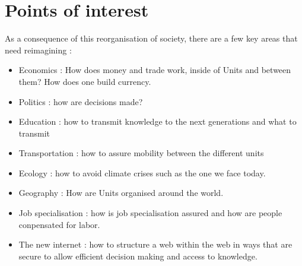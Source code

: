 \section{Points of interest}
As a consequence of this reorganisation of society, there are a few key areas that need reimagining : 
\begin{itemize}
    \item Economics : How does money and trade work, inside of Units and between them? How does one build currency.
    \item Politics : how are decisions made? 
    \item Education : how to transmit knowledge to the next generations and what to transmit
    \item Transportation : how to assure mobility between the different units
    \item Ecology : how to avoid climate crises such as the one we face today.
    \item Geography : How are Units organised around the world.
    \item Job specialisation : how is job specialisation assured and how are people conpensated for labor.
    \item The new internet : how to structure a web within the web in ways that are secure to allow efficient decision making and access to knowledge.  
\end{itemize}
